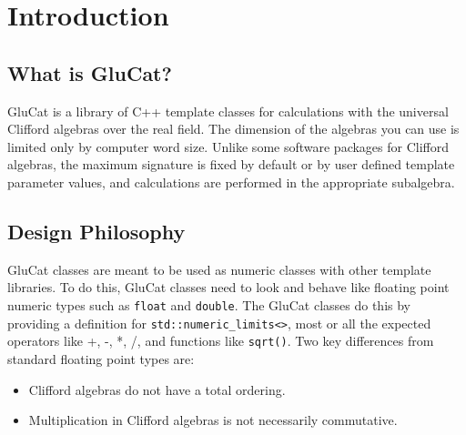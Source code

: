 \chapter{Introduction}
\label{ch:intro_glucat}

\section{What is GluCat?}
GluCat is a library of C++ template classes for calculations with the universal Clifford algebras over the real field. The dimension of the algebras you can use is limited only by computer word size. Unlike some software packages for Clifford algebras, the maximum signature is fixed by default or by user defined template parameter values, and calculations are performed in the appropriate subalgebra.

\section{Design Philosophy}
GluCat classes are meant to be used as numeric classes with other template libraries. To do this, GluCat classes need to look and behave like floating point numeric types such as \texttt{float} and \texttt{double}. The GluCat classes do this by providing a definition for \texttt{std::numeric\_limits<>}, most or all the expected operators like +, -, *, /, and functions like \texttt{sqrt()}.
Two key differences from standard floating point types are:
\begin{itemize}
    \item Clifford algebras do not have a total ordering.
    \item Multiplication in Clifford algebras is not necessarily commutative.
\end{itemize}
